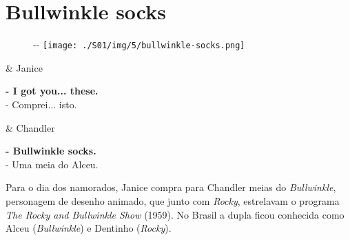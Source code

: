 \hypertarget{bullwinkle-socks}{%
\section{Bullwinkle socks}\label{bullwinkle-socks}}

\begin{figure}[!ht]
  \begin{adjustwidth}{-\oddsidemargin-1in}{-\rightmargin}
    \centering
    \texttt{[image: ./S01/img/5/bullwinkle-socks.png]}
  \end{adjustwidth}
\end{figure}

\begin{tcolorbox}[enhanced,center upper,
    drop fuzzy shadow southeast, boxrule=0.3pt,
    lower separated=false,
    colframe=black!30!dialogoBorder,colback=white]
\begin{minipage}[c]{0.16\linewidth}
   & \centering \scriptsize{Janice}
\end{minipage}
\hfill
\begin{minipage}[c]{0.8\linewidth}
  \textbf{- I got you... these.}\\
  - Comprei... isto.
\end{minipage}

\medskip
\begin{minipage}[c]{0.16\linewidth}
   & \centering \scriptsize{Chandler}
\end{minipage}
\hfill
\begin{minipage}[c]{0.8\linewidth}
  \textbf{- Bullwinkle socks.}\\
  - Uma meia do Alceu.
\end{minipage}
\end{tcolorbox}

Para o dia dos namorados, Janice compra para Chandler meias do
\emph{Bullwinkle}, personagem de desenho animado, que junto com
\emph{Rocky}, estrelavam o programa \emph{The Rocky and Bullwinkle Show}
(1959). No Brasil a dupla ficou conhecida como Alceu (\emph{Bullwinkle})
e Dentinho (\emph{Rocky}).

